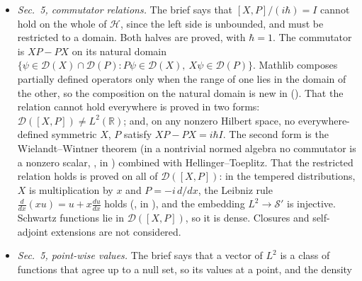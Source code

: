 \documentclass[11pt]{article}
\begin{document}
\begin{itemize}
  for Kato--Rellich (). The extension is unbounded,
  since already $H_0 + V$ is
  (): for a bump $f$ with
  support in $U$, multiplying by $e^{itx}$ changes neither $\|f\|$ nor $\|Vf\|$, while
  \[ \|H_0\,e^{itx}f\| \ge \tfrac12\,\bigl(t^2\|f\| - 2t\|f'\| - \|f''\|\bigr). \]
  The self-adjoint
  realization is not unique in general: for $-x^4$ or $-1/x^2$ they differ by boundary
  conditions at infinity or at $0$. Which one is physical is a choice of the model, not a
  condition of the remark, which holds for each. For the potential part, $V(y) = y^2$ and the
  state $\phi = U\psi$ of Proposition~3 are used: $\phi \in L^2$, but $V\phi \notin L^2$; for
  $V(y) = y$ this is .
\item \emph{Sec.~5, commutator relations.} The brief says that $[X,P]/(i\hbar) = I$ cannot
  hold on the whole of $\mathcal{H}$, since the left side is unbounded, and must be restricted
  to a domain. Both halves are proved, with $\hbar = 1$. The commutator  is
  $XP - PX$ on its natural domain $\{\psi \in \mathcal{D}(X) \cap \mathcal{D}(P) : P\psi \in
  \mathcal{D}(X),\ X\psi \in \mathcal{D}(P)\}$. Mathlib composes partially defined operators
  only when the range of one lies in the domain of the other, so the composition on the
  natural domain is new in  (). That the relation
  cannot hold everywhere is proved in two forms: $\mathcal{D}([X,P]) \ne L^2(\mathbb{R})$;
  and, on any nonzero Hilbert space, no everywhere-defined symmetric $X$, $P$ satisfy
  $XP - PX = i\hbar I$. The second form is the Wielandt--Wintner theorem (in a nontrivial
  normed algebra no commutator is a nonzero scalar, , in
  ) combined with Hellinger--Toeplitz. That the restricted relation holds is
  proved on all of $\mathcal{D}([X,P])$: in the tempered distributions, $X$ is
  multiplication by $x$ and $P = -i\,d/dx$, the Leibniz rule
  $\tfrac{d}{dx}(xu) = u + x\tfrac{du}{dx}$ holds
  (, in ), and the
  embedding $L^2 \to \mathcal{S}'$ is injective. Schwartz functions lie in
  $\mathcal{D}([X,P])$, so it is dense. Closures and self-adjoint extensions are not
  considered.
\item \emph{Sec.~5, point-wise values.} The brief says that a vector of $L^2$ is a class of
  functions that agree up to a null set, so its values at a point, and the density

\end{itemize}
\end{document}
